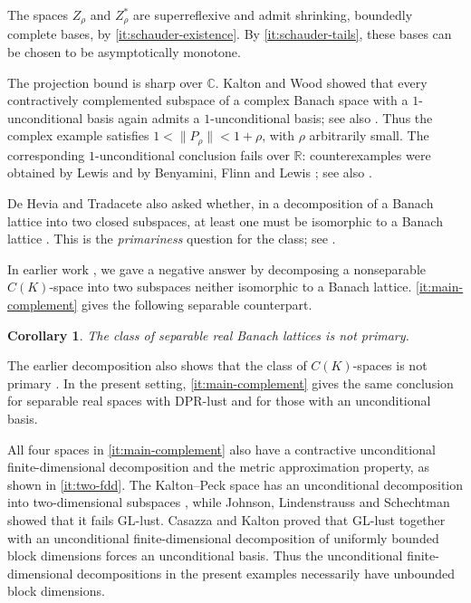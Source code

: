 \documentclass[11pt,a4paper,reqno]{amsart}
\newtheorem{maincorollary}[maincorollary]{Corollary}
\theoremstyle{definition}
\newcommand{\R}{\mathbb R}
\newcommand{\C}{\mathbb C}
\newcommand{\norm}[1]{\lVert #1\rVert}
\numberwithin{equation}{section}
\begin{document}
The spaces $Z_\rho$ and $Z_\rho^*$ are superreflexive and admit shrinking, boundedly complete bases, by \ref{it:schauder-existence}. By \ref{it:schauder-tails}, these bases can be chosen to be asymptotically monotone.

The projection bound is sharp over $\C$. Kalton and Wood \cite{KaltonWood1976} showed that every contractively complemented subspace of a complex Banach space with a $1$-unconditional basis again admits a $1$-unconditional basis; see also \cite[Theorem~7.18]{Randrianantoanina2001}. Thus the complex example satisfies $1<\norm{P_\rho}<1+\rho$, with $\rho$ arbitrarily small. The corresponding $1$-unconditional conclusion fails over $\R$: counterexamples were obtained by Lewis \cite{Lewis1979} and by Benyamini, Flinn and Lewis \cite{BenyaminiFlinnLewis1984}; see also \cite[Proposition~7.25]{Randrianantoanina2001}.

De Hevia and Tradacete also asked whether, in a decomposition of a Banach lattice into two closed subspaces, at least one must be isomorphic to a Banach lattice \cite[Question~4]{DeHeviaTradacete2025}. This is the \emph{primariness} question for the class; see .

In earlier work \cite{Acuaviva2026}, we gave a negative answer by decomposing a nonseparable $C(K)$-space into two subspaces neither isomorphic to a Banach lattice. \ref{it:main-complement} gives the following separable counterpart.

\begin{maincorollary}\label{cor:separable-nonprimarity}
The class of separable real Banach lattices is not primary.
\end{maincorollary}

The earlier decomposition also shows that the class of $C(K)$-spaces is not primary \cite{Acuaviva2026}. In the present setting, \ref{it:main-complement} gives the same conclusion for separable real spaces with DPR-lust and for those with an unconditional basis.

All four spaces in \ref{it:main-complement} also have a contractive unconditional finite-dimensional decomposition and the metric approximation property, as shown in \ref{it:two-fdd}. The Kalton--Peck space has an unconditional decomposition into two-dimensional subspaces \cite{KaltonPeck1979}, while Johnson, Lindenstrauss and Schechtman \cite{JohnsonLindenstraussSchechtman1980} showed that it fails GL-lust. Casazza and Kalton \cite[Theorem~3.8]{CasazzaKalton1996} proved that GL-lust together with an unconditional finite-dimensional decomposition of uniformly bounded block dimensions forces an unconditional basis. Thus the unconditional finite-dimensional decompositions in the present examples necessarily have unbounded block dimensions.
\end{document}
